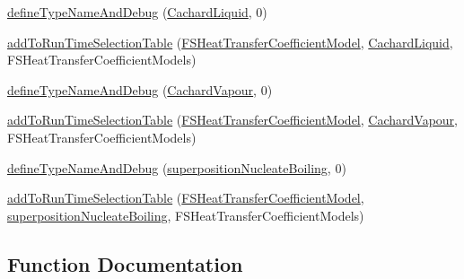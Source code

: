\begin{DoxyCompactItemize}
\item 
\hyperlink{namespaceFoam_1_1FSHeatTransferCoefficientModels_a3a11c801138bfa25f60a895351be07ba}{define\+Type\+Name\+And\+Debug} (\hyperlink{classFoam_1_1FSHeatTransferCoefficientModels_1_1CachardLiquid}{Cachard\+Liquid}, 0)
\item 
\hyperlink{namespaceFoam_1_1FSHeatTransferCoefficientModels_a41cb4ed8067c3384088f1bccbea434e1}{add\+To\+Run\+Time\+Selection\+Table} (\hyperlink{classFoam_1_1FSHeatTransferCoefficientModel}{F\+S\+Heat\+Transfer\+Coefficient\+Model}, \hyperlink{classFoam_1_1FSHeatTransferCoefficientModels_1_1CachardLiquid}{Cachard\+Liquid}, F\+S\+Heat\+Transfer\+Coefficient\+Models)
\item 
\hyperlink{namespaceFoam_1_1FSHeatTransferCoefficientModels_aa6d8ea7c345a56fdddf36a00b2607634}{define\+Type\+Name\+And\+Debug} (\hyperlink{classFoam_1_1FSHeatTransferCoefficientModels_1_1CachardVapour}{Cachard\+Vapour}, 0)
\item 
\hyperlink{namespaceFoam_1_1FSHeatTransferCoefficientModels_afe9667c2d878e144c3f3712ef8a1588b}{add\+To\+Run\+Time\+Selection\+Table} (\hyperlink{classFoam_1_1FSHeatTransferCoefficientModel}{F\+S\+Heat\+Transfer\+Coefficient\+Model}, \hyperlink{classFoam_1_1FSHeatTransferCoefficientModels_1_1CachardVapour}{Cachard\+Vapour}, F\+S\+Heat\+Transfer\+Coefficient\+Models)
\item 
\hyperlink{namespaceFoam_1_1FSHeatTransferCoefficientModels_af3b9f6c9cfde02a04d9369c7e7fdf29d}{define\+Type\+Name\+And\+Debug} (\hyperlink{classFoam_1_1FSHeatTransferCoefficientModels_1_1superpositionNucleateBoiling}{superposition\+Nucleate\+Boiling}, 0)
\item 
\hyperlink{namespaceFoam_1_1FSHeatTransferCoefficientModels_a10299c3acec9d80a639650acf609c5db}{add\+To\+Run\+Time\+Selection\+Table} (\hyperlink{classFoam_1_1FSHeatTransferCoefficientModel}{F\+S\+Heat\+Transfer\+Coefficient\+Model}, \hyperlink{classFoam_1_1FSHeatTransferCoefficientModels_1_1superpositionNucleateBoiling}{superposition\+Nucleate\+Boiling}, F\+S\+Heat\+Transfer\+Coefficient\+Models)
\end{DoxyCompactItemize}


\subsection{Function Documentation}
\mbox{\label{namespaceFoam_1_1FSHeatTransferCoefficientModels_af45fd09a359594abd439c3cb7bb5cd5e}} 
